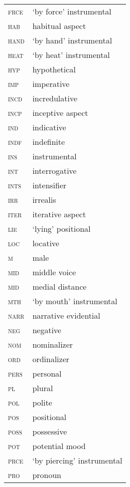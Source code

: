 \begin{tabularx}{.45\textwidth}{lQ}
        \textsc{frce} & `by force' instrumental \\ 
        \textsc{hab} & habitual aspect \\
        \textsc{hand} & `by hand' instrumental \\ 
        \textsc{heat} & `by heat' instrumental \\ 
        \textsc{hyp} & hypothetical \\
        \textsc{imp} & imperative \\ 
        \textsc{incd} & incredulative \\ 
        \textsc{incp} & inceptive aspect \\ 
        \textsc{ind} & indicative \\ 
        \textsc{indf} & indefinite \\ 
        \textsc{ins} & instrumental \\ 
        \textsc{int} & interrogative \\ 
        \textsc{ints} & intensifier \\ 
        \textsc{irr} & irrealis \\ 
        \textsc{iter} & iterative aspect \\ 
        \textsc{lie} & `lying' positional \\ 
        \textsc{loc} & locative \\ 
        \textsc{m} & male \\ 
        \textsc{mid} & middle voice \\ 
        \textsc{mid} & medial distance \\ 
        \textsc{mth} & `by mouth' instrumental \\ 
        \textsc{narr} & narrative evidential \\ 
        \textsc{neg} & negative \\ 
        \textsc{nom} & nominalizer \\ 
        \textsc{ord} & ordinalizer \\ 
        \textsc{pers} & personal \\ 
        \textsc{pl} & plural \\ 
        \textsc{pol} & polite\\
        \textsc{pos} & positional \\ 
        \textsc{poss} & possessive \\ 
        \textsc{pot} & potential mood \\ 
        \textsc{prce} & `by piercing' instrumental \\ 
        \textsc{pro} & pronoun \\ 
\end{tabularx}






